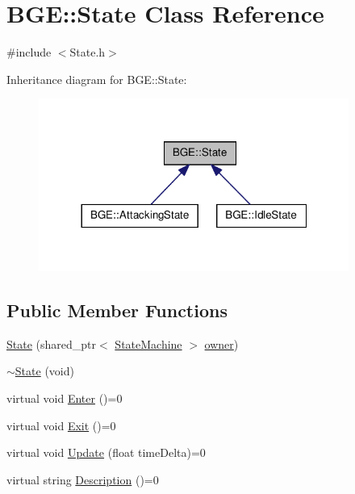 \hypertarget{class_b_g_e_1_1_state}{\section{B\-G\-E\-:\-:State Class Reference}
\label{class_b_g_e_1_1_state}
}


{\ttfamily \#include $<$State.\-h$>$}



Inheritance diagram for B\-G\-E\-:\-:State\-:
\nopagebreak
\begin{figure}[H]
\begin{center}
\leavevmode
\includegraphics[width=288pt]{class_b_g_e_1_1_state__inherit__graph}
\end{center}
\end{figure}
\subsection*{Public Member Functions}
\begin{DoxyCompactItemize}
\item 
\hyperlink{class_b_g_e_1_1_state_a9ffc708ee016a83fca587e1b73bc51f6}{State} (shared\-\_\-ptr$<$ \hyperlink{class_b_g_e_1_1_state_machine}{State\-Machine} $>$ \hyperlink{class_b_g_e_1_1_state_aa1a572a6e24067716eab1f110381bee8}{owner})
\item 
\hyperlink{class_b_g_e_1_1_state_a42d951e307f5b6d1966e15f417cc4101}{$\sim$\-State} (void)
\item 
virtual void \hyperlink{class_b_g_e_1_1_state_aba53736a51aaaa40dc291ca11f1bf898}{Enter} ()=0
\item 
virtual void \hyperlink{class_b_g_e_1_1_state_abb88facc6da96e36d4f8d791d81bf321}{Exit} ()=0
\item 
virtual void \hyperlink{class_b_g_e_1_1_state_a75100a8a3efed7336de7bbf910d48fe9}{Update} (float time\-Delta)=0
\item 
virtual string \hyperlink{class_b_g_e_1_1_state_a5823daa8624877cb3113033f03d51558}{Description} ()=0
\end{DoxyCompactItemize}
